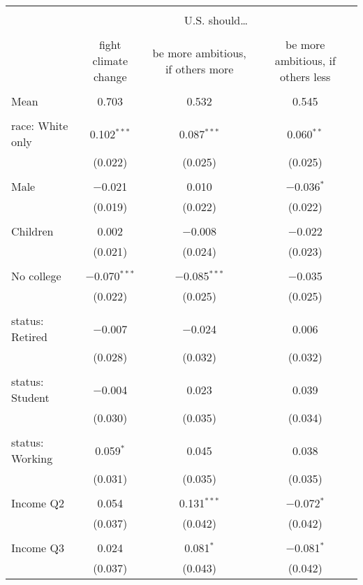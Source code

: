 
\begin{tabular}{@{\extracolsep{5pt}}lccc} 
\\[-1.8ex]\hline 
\hline \\[-1.8ex] 
 & \multicolumn{3}{c}{U.S. should… } \\ 
\cline{2-4} 
\\[-1.8ex] & fight climate change & be more ambitious, if others more & be more ambitious, if others less \\ 
\hline \\[-1.8ex] 
 Mean & 0.703 & 0.532 & 0.545  \\ \hline \\[-1.8ex] race: White only & 0.102$^{***}$ & 0.087$^{***}$ & 0.060$^{**}$ \\ 
  & (0.022) & (0.025) & (0.025) \\ 
  & & & \\ 
 Male & $-$0.021 & 0.010 & $-$0.036$^{*}$ \\ 
  & (0.019) & (0.022) & (0.022) \\ 
  & & & \\ 
 Children & 0.002 & $-$0.008 & $-$0.022 \\ 
  & (0.021) & (0.024) & (0.023) \\ 
  & & & \\ 
 No college & $-$0.070$^{***}$ & $-$0.085$^{***}$ & $-$0.035 \\ 
  & (0.022) & (0.025) & (0.025) \\ 
  & & & \\ 
 status: Retired & $-$0.007 & $-$0.024 & 0.006 \\ 
  & (0.028) & (0.032) & (0.032) \\ 
  & & & \\ 
 status: Student & $-$0.004 & 0.023 & 0.039 \\ 
  & (0.030) & (0.035) & (0.034) \\ 
  & & & \\ 
 status: Working & 0.059$^{*}$ & 0.045 & 0.038 \\ 
  & (0.031) & (0.035) & (0.035) \\ 
  & & & \\ 
 Income Q2 & 0.054 & 0.131$^{***}$ & $-$0.072$^{*}$ \\ 
  & (0.037) & (0.042) & (0.042) \\ 
  & & & \\ 
 Income Q3 & 0.024 & 0.081$^{*}$ & $-$0.081$^{*}$ \\ 
  & (0.037) & (0.043) & (0.042) \\ 

\end{tabular}
